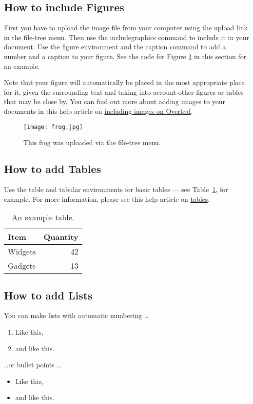 \documentclass{article}
\begin{document}
\subsection{How to include Figures}

First you have to upload the image file from your computer using the upload link in the file-tree menu. Then use the includegraphics command to include it in your document. Use the figure environment and the caption command to add a number and a caption to your figure. See the code for Figure \ref{fig:frog} in this section for an example.

Note that your figure will automatically be placed in the most appropriate place for it, given the surrounding text and taking into account other figures or tables that may be close by. You can find out more about adding images to your documents in this help article on \href{https://www.overleaf.com/learn/how-to/Including_images_on_Overleaf}{including images on Overleaf}.

\begin{figure}
\centering
\texttt{[image: frog.jpg]}
\caption{\label{fig:frog}This frog was uploaded via the file-tree menu.}
\end{figure}

\subsection{How to add Tables}

Use the table and tabular environments for basic tables --- see Table~\ref{tab:widgets}, for example. For more information, please see this help article on \href{https://www.overleaf.com/learn/latex/tables}{tables}. 

\begin{table}
\centering
\begin{tabular}{l|r}
Item & Quantity \\\hline
Widgets & 42 \\
Gadgets & 13
\end{tabular}
\caption{\label{tab:widgets}An example table.}
\end{table}

\subsection{How to add Lists}

You can make lists with automatic numbering \dots

\begin{enumerate}
\item Like this,
\item and like this.
\end{enumerate}
\dots or bullet points \dots
\begin{itemize}
\item Like this,
\item and like this.
\end{itemize}
\end{document}
